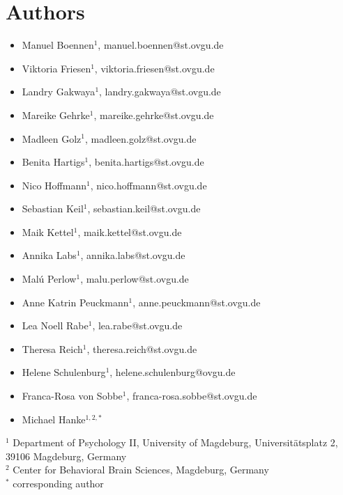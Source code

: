 \section*{Authors}

\begin{itemize}
\item Manuel Boennen$^{1}$, manuel.boennen@st.ovgu.de
\item Viktoria Friesen$^{1}$, viktoria.friesen@st.ovgu.de
\item Landry Gakwaya$^{1}$, landry.gakwaya@st.ovgu.de
\item Mareike Gehrke$^{1}$, mareike.gehrke@st.ovgu.de
\item Madleen Golz$^{1}$, madleen.golz@st.ovgu.de
\item Benita Hartigs$^{1}$, benita.hartigs@st.ovgu.de
\item Nico Hoffmann$^{1}$, nico.hoffmann@st.ovgu.de
\item Sebastian Keil$^{1}$, sebastian.keil@st.ovgu.de
\item Maik Kettel$^{1}$, maik.kettel@st.ovgu.de
\item Annika Labs$^{1}$, annika.labs@st.ovgu.de
\item Malú Perlow$^{1}$, malu.perlow@st.ovgu.de
\item Anne Katrin Peuckmann$^{1}$, anne.peuckmann@st.ovgu.de
\item Lea Noell Rabe$^{1}$, lea.rabe@st.ovgu.de
\item Theresa Reich$^{1}$, theresa.reich@st.ovgu.de
\item Helene Schulenburg$^{1}$, helene.schulenburg@ovgu.de
\item Franca-Rosa von Sobbe$^{1}$, franca-rosa.sobbe@st.ovgu.de
\item Michael Hanke$^{1,2,*}$
\end{itemize}

$^{1}$ Department of Psychology II, University of Magdeburg, Universitätsplatz 2, 39106 Magdeburg, Germany\\
$^{2}$ Center for Behavioral Brain Sciences, Magdeburg, Germany\\
$^{*}$ corresponding author